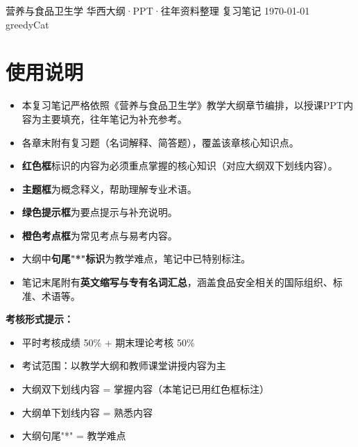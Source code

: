 \documentclass[10pt,a4paper,oneside]{ctexbook}
\begin{document}
\makecover
  {营养与食品卫生学}
  {华西大纲·PPT·往年资料整理}
  {复习笔记}
  {\today}
  {greedyCat}

\tableofcontents

\chapter*{使用说明}

\begin{itemize}[leftmargin=*]
    \item 本复习笔记严格依照《营养与食品卫生学》教学大纲章节编排，以授课PPT内容为主要填充，往年笔记为补充参考。
    \item 各章末附有复习题（名词解释、简答题），覆盖该章核心知识点。
    \item \textbf{\color{keyred}红色框}标识的内容为必须重点掌握的核心知识（对应大纲双下划线内容）。
    \item \textbf{\color{main}主题框}为概念释义，帮助理解专业术语。
    \item \textbf{\color{darkgreen}绿色提示框}为要点提示与补充说明。
    \item \textbf{\color{orange}橙色考点框}为常见考点与易考内容。
    \item 大纲中\textbf{句尾"*"标识}为教学难点，笔记中已特别标注。
    \item 笔记末尾附有\textbf{英文缩写与专有名词汇总}，涵盖食品安全相关的国际组织、标准、术语等。
\end{itemize}

\vspace{1cm}
\begin{center}
\begin{tcolorbox}[colback=yellow!10, colframe=yellow!80!black, boxrule=0.8pt, arc=6pt, width=0.85\textwidth, breakable]
\textbf{考核形式提示：}
\begin{itemize}[leftmargin=*]
    \item 平时考核成绩 50\% + 期末理论考核 50\%
    \item 考试范围：以教学大纲和教师课堂讲授内容为主
    \item 大纲双下划线内容 = 掌握内容（本笔记已用红色框标注）
    \item 大纲单下划线内容 = 熟悉内容
    \item 大纲句尾"*" = 教学难点
\end{itemize}
\end{tcolorbox}
\end{center}
\end{document}
